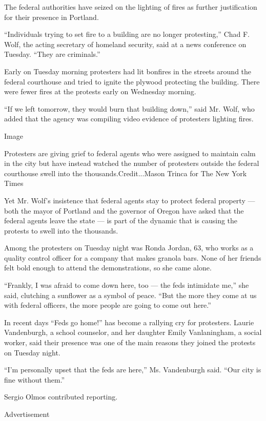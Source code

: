 The federal authorities have seized on the lighting of fires as further
justification for their presence in Portland.

``Individuals trying to set fire to a building are no longer
protesting,'' Chad F. Wolf, the acting secretary of homeland security,
said at a news conference on Tuesday. ``They are criminals.''

Early on Tuesday morning protesters had lit bonfires in the streets
around the federal courthouse and tried to ignite the plywood protecting
the building. There were fewer fires at the protests early on Wednesday
morning.

``If we left tomorrow, they would burn that building down,'' said Mr.
Wolf, who added that the agency was compiling video evidence of
protesters lighting fires.

Image

Protesters are giving grief to federal agents who were assigned to
maintain calm in the city but have instead watched the number of
protesters outside the federal courthouse swell into the
thousands.Credit...Mason Trinca for The New York Times

Yet Mr. Wolf's insistence that federal agents stay to protect federal
property --- both the mayor of Portland and the governor of Oregon have
asked that the federal agents leave the state --- is part of the dynamic
that is causing the protests to swell into the thousands.

Among the protesters on Tuesday night was Ronda Jordan, 63, who works as
a quality control officer for a company that makes granola bars. None of
her friends felt bold enough to attend the demonstrations, so she came
alone.

``Frankly, I was afraid to come down here, too --- the feds intimidate
me,'' she said, clutching a sunflower as a symbol of peace. ``But the
more they come at us with federal officers, the more people are going to
come out here.''

In recent days ``Feds go home!'' has become a rallying cry for
protesters. Laurie Vandenburgh, a school counselor, and her daughter
Emily Vanlaningham, a social worker, said their presence was one of the
main reasons they joined the protests on Tuesday night.

``I'm personally upset that the feds are here,'' Ms. Vandenburgh said.
``Our city is fine without them.''

Sergio Olmos contributed reporting.

Advertisement

